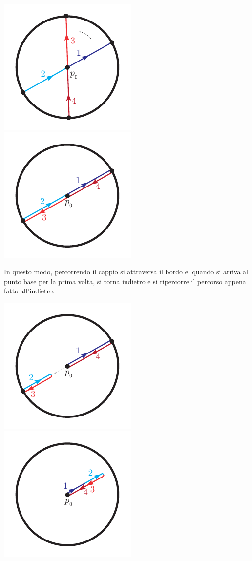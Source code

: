 \begin{itemize}
\begin{center}
			\includegraphics[trim=0cm 0cm 0cm 0cm,clip,scale=0.95]{images/projdiscdouble2.pdf}
			\includegraphics[trim=0cm 0cm 0cm 0cm,clip,scale=0.95]{images/projdiscdouble3.pdf}
		\end{center}
		In questo modo, percorrendo il cappio si attraversa il bordo e, quando si arriva al punto base per la prima volta, si torna indietro e si ripercorre il percorso appena fatto all'indietro.
		\begin{center}
			\includegraphics[trim=0cm 0cm 0cm 0cm,clip,scale=0.95]{images/projdiscdouble4.pdf}
			\includegraphics[trim=0cm 0cm 0cm 0cm,clip,scale=0.95]{images/projdiscdouble5.pdf}

\end{center}
\end{itemize}
